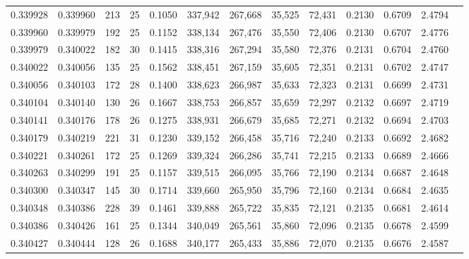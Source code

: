 \begin{tabular}{rrrrrrrrrrrrr}
0.339928 & 0.339960 &   213 &  25 &                                     0.1050 & 337,942 & 267,668 &  35,525 &  72,431 & 0.2130 & 0.6709 & 2.4794 \\
0.339960 & 0.339979 &   192 &  25 &                                     0.1152 & 338,134 & 267,476 &  35,550 &  72,406 & 0.2130 & 0.6707 & 2.4776 \\
0.339979 & 0.340022 &   182 &  30 &                                     0.1415 & 338,316 & 267,294 &  35,580 &  72,376 & 0.2131 & 0.6704 & 2.4760 \\
0.340022 & 0.340056 &   135 &  25 &                                     0.1562 & 338,451 & 267,159 &  35,605 &  72,351 & 0.2131 & 0.6702 & 2.4747 \\
0.340056 & 0.340103 &   172 &  28 &                                     0.1400 & 338,623 & 266,987 &  35,633 &  72,323 & 0.2131 & 0.6699 & 2.4731 \\
0.340104 & 0.340140 &   130 &  26 &                                     0.1667 & 338,753 & 266,857 &  35,659 &  72,297 & 0.2132 & 0.6697 & 2.4719 \\
0.340141 & 0.340176 &   178 &  26 &                                     0.1275 & 338,931 & 266,679 &  35,685 &  72,271 & 0.2132 & 0.6694 & 2.4703 \\
0.340179 & 0.340219 &   221 &  31 &                                     0.1230 & 339,152 & 266,458 &  35,716 &  72,240 & 0.2133 & 0.6692 & 2.4682 \\
0.340221 & 0.340261 &   172 &  25 &                                     0.1269 & 339,324 & 266,286 &  35,741 &  72,215 & 0.2133 & 0.6689 & 2.4666 \\
0.340263 & 0.340299 &   191 &  25 &                                     0.1157 & 339,515 & 266,095 &  35,766 &  72,190 & 0.2134 & 0.6687 & 2.4648 \\
0.340300 & 0.340347 &   145 &  30 &                                     0.1714 & 339,660 & 265,950 &  35,796 &  72,160 & 0.2134 & 0.6684 & 2.4635 \\
0.340348 & 0.340386 &   228 &  39 &                                     0.1461 & 339,888 & 265,722 &  35,835 &  72,121 & 0.2135 & 0.6681 & 2.4614 \\
0.340386 & 0.340426 &   161 &  25 &                                     0.1344 & 340,049 & 265,561 &  35,860 &  72,096 & 0.2135 & 0.6678 & 2.4599 \\
0.340427 & 0.340444 &   128 &  26 &                                     0.1688 & 340,177 & 265,433 &  35,886 &  72,070 & 0.2135 & 0.6676 & 2.4587 \\

\end{tabular}
